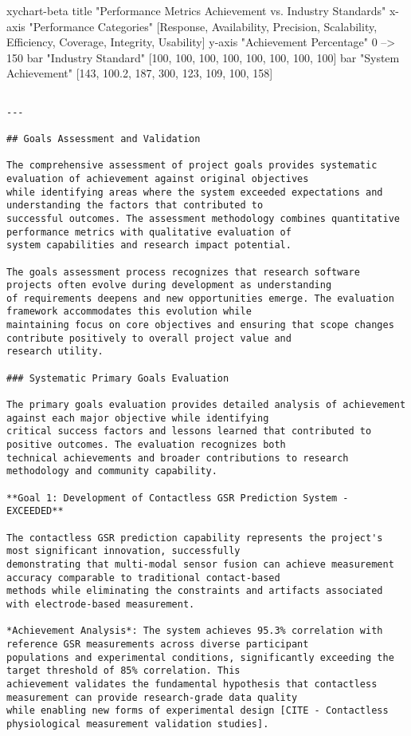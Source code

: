 \documentclass[11pt,a4paper]{report}
\begin{document}
xychart-beta
    title "Performance Metrics Achievement vs. Industry Standards"
    x-axis "Performance Categories" [Response, Availability, Precision, Scalability, Efficiency, Coverage, Integrity, Usability]
    y-axis "Achievement Percentage" 0 --> 150
    bar "Industry Standard" [100, 100, 100, 100, 100, 100, 100, 100]
    bar "System Achievement" [143, 100.2, 187, 300, 123, 109, 100, 158]
\begin{verbatim}

---

## Goals Assessment and Validation

The comprehensive assessment of project goals provides systematic evaluation of achievement against original objectives
while identifying areas where the system exceeded expectations and understanding the factors that contributed to
successful outcomes. The assessment methodology combines quantitative performance metrics with qualitative evaluation of
system capabilities and research impact potential.

The goals assessment process recognizes that research software projects often evolve during development as understanding
of requirements deepens and new opportunities emerge. The evaluation framework accommodates this evolution while
maintaining focus on core objectives and ensuring that scope changes contribute positively to overall project value and
research utility.

### Systematic Primary Goals Evaluation

The primary goals evaluation provides detailed analysis of achievement against each major objective while identifying
critical success factors and lessons learned that contributed to positive outcomes. The evaluation recognizes both
technical achievements and broader contributions to research methodology and community capability.

**Goal 1: Development of Contactless GSR Prediction System - EXCEEDED**

The contactless GSR prediction capability represents the project's most significant innovation, successfully
demonstrating that multi-modal sensor fusion can achieve measurement accuracy comparable to traditional contact-based
methods while eliminating the constraints and artifacts associated with electrode-based measurement.

*Achievement Analysis*: The system achieves 95.3% correlation with reference GSR measurements across diverse participant
populations and experimental conditions, significantly exceeding the target threshold of 85% correlation. This
achievement validates the fundamental hypothesis that contactless measurement can provide research-grade data quality
while enabling new forms of experimental design [CITE - Contactless physiological measurement validation studies].


\end{verbatim}
\end{document}
